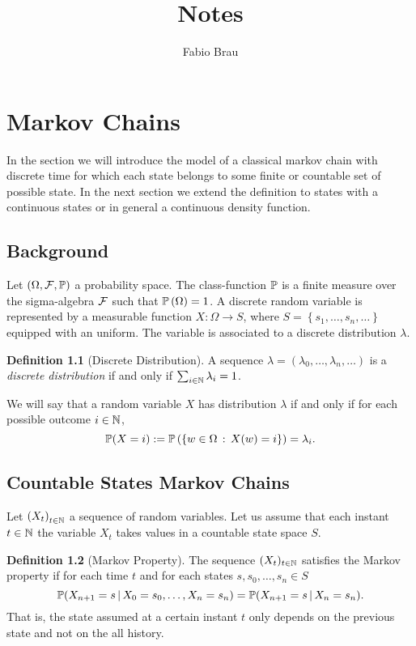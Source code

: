 \documentclass{report}
\title{Notes}
\author{Fabio Brau}
\theoremstyle{definition}
\newtheorem{defn}{Definition}
\begin{document}
\maketitle
\tableofcontents
\chapter{Markov Chains}
In the section we will introduce the model of a classical markov chain with
discrete time for which each state belongs to some finite or countable set of
possible state. In the next section we extend the definition to states with a
continuous states or in general a continuous density function.
\section{Background}
Let $\left( \Omega, \mathcal{F}, \mathbb{P} \right)$ a probability space. The class-function $\mathbb{P}$
is a finite measure over the sigma-algebra $\mathcal{F}$ such that
$\mathbb{P}\left(\Omega\right)=1$. A discrete random variable is represented by a
measurable function $X:\Omega\to S$, where $S=\left\{ s_1,\dots,s_n,\dots
\right\}$ equipped with an uniform. The variable is associated to a discrete
distribution $\lambda$.
\begin{defn}[Discrete Distribution]
A sequence $\lambda=\left( \lambda_0,\dots,\lambda_n,\dots \right)$ is a
\textit{discrete distribution} if and only if $\sum_{i\in\mathbb{N}} \lambda_i = 1$.
\end{defn}

We will say that a random variable $X$ has distribution $\lambda$ if and only
if for each possible outcome $i\in\mathbb{N}$, 
\begin{equation}
  \mathbb{P}(X=i):= \mathbb{P}\left( \left\{ w\in\Omega\,:\, X(w)=i \right\}
  \right)=\lambda_i.
  \label{eq:discrete-distribution}
\end{equation}
\section{Countable States Markov Chains}
Let $\left( X_t \right)_{t\in\mathbb{N}}$ a sequence of random variables. Let us
assume that each instant $t\in\mathbb{N}$ the variable $X_t$ takes values in a countable state space $S$. 
\begin{defn}[Markov Property]
The sequence $(X_t)_{t\in\mathbb{N}}$ satisfies the Markov property if for each time
$t$ and for each states $s,s_0,\dots,s_n\in S$
\begin{equation}
  \mathbb{P}(X_{n+1}=s\,\vert\,
  X_0=s_0,\dots,X_n=s_n)=\mathbb{P}(X_{n+1}=s\,\vert\, X_n=s_n).
  \label{eq:markov-property}
\end{equation}
That is, the state assumed at a certain instant $t$ only depends on the
previous state and not on the all history.
\end{defn}
\end{document}
